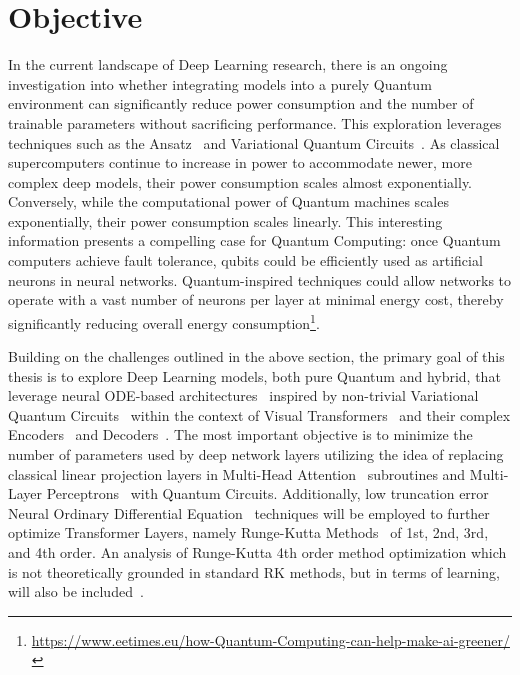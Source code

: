 \documentclass[12pt,a4paper]{report}
\begin{document}
\section{Objective}\vspace{-12pt}
In the current landscape of Deep Learning research, there is an ongoing investigation into whether integrating models into a purely Quantum environment can significantly reduce power consumption and the number of trainable parameters without sacrificing performance. This exploration leverages techniques such as the Ansatz~\cite{hadfield2019Quantum} and Variational Quantum Circuits~\cite{cerezo2021variational}. As classical supercomputers continue to increase in power to accommodate newer, more complex deep models, their power consumption scales almost exponentially. Conversely, while the computational power of Quantum machines scales exponentially, their power consumption scales linearly. This interesting information presents a compelling case for Quantum Computing: once Quantum computers achieve fault tolerance, qubits could be efficiently used as artificial neurons in neural networks. Quantum-inspired techniques could allow networks to operate with a vast number of neurons per layer at minimal energy cost, thereby significantly reducing overall energy consumption\footnote{\url{https://www.eetimes.eu/how-Quantum-Computing-can-help-make-ai-greener/}}.

Building on the challenges outlined in the above section, the primary goal of this thesis is to explore Deep Learning models, both pure Quantum and hybrid, that leverage neural ODE-based architectures~\cite{zhong2022neural} inspired by non-trivial Variational Quantum Circuits~\cite{cerezo2021variational} within the context of Visual Transformers~\cite{vaswani2017attention} and their complex Encoders~\cite{hinton2011transforming} and Decoders~\cite{breuckmann2018scalable}. The most important objective is to minimize the number of parameters used by deep network layers utilizing the idea of replacing classical linear projection layers in Multi-Head Attention~\cite{voita2019analyzing} subroutines and Multi-Layer Perceptrons~\cite{popescu2009multilayer} with Quantum Circuits. Additionally, low truncation error Neural Ordinary Differential Equation~\cite{zhong2022neural}\cite{li2022ode} techniques will be employed to further optimize Transformer Layers, namely Runge-Kutta Methods~\cite{butcher1996history} of 1st, 2nd, 3rd, and 4th order. An analysis of Runge-Kutta 4th order method optimization which is not theoretically grounded in standard RK methods, but in terms of learning, will also be included~\cite{li2022ode}.
\end{document}
